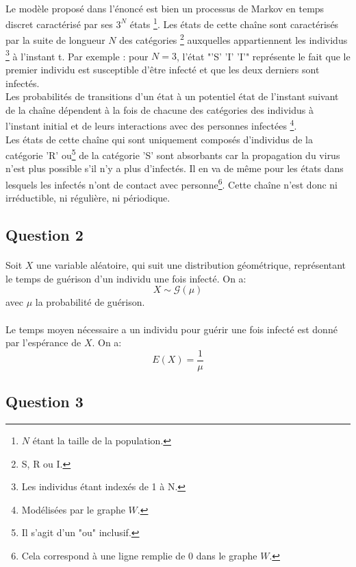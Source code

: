 \documentclass[a4paper, 12pt, oneside]{article}
\begin{document}
\paragraph{}Le modèle proposé dans l'énoncé est bien un processus de Markov en temps discret caractérisé par ses $3^N$ états \footnote{$N$ étant la taille de la population.}. Les états de cette chaîne sont caractérisés par la suite de longueur $N$ des catégories \footnote{S, R ou I.} auxquelles appartiennent les individus \footnote{Les individus étant indexés de 1 à N.} à l'instant t. Par exemple : pour $N = 3$, l'état "'S' 'I' 'I'" représente le fait que le premier individu est susceptible d'être infecté et que les deux derniers sont infectés.\\
\indent Les probabilités de transitions d'un état à un potentiel état de l'instant suivant de la chaîne dépendent à la fois de chacune des catégories des individus à l'instant initial et de leurs interactions avec des personnes infectées \footnote{Modélisées par le graphe $W$.}.\\
\indent Les états de cette chaîne qui sont uniquement composés d'individus de la catégorie 'R' ou\footnote{Il s'agit d'un "ou" inclusif.} de la catégorie 'S' sont absorbants car la propagation du virus n'est plus possible s'il n'y a plus d'infectés. Il en va de même pour les états dans lesquels les infectés n'ont de contact avec personne\footnote{Cela correspond à une ligne remplie de 0 dans le graphe $W$.}. Cette chaîne n'est donc ni irréductible, ni régulière, ni périodique.

\subsection{Question 2}

\paragraph{}Soit $X$ une variable aléatoire, qui suit une distribution géométrique, représentant le temps de guérison d'un individu une fois infecté. On a: $$X \sim \mathcal{G}(\mu)$$ avec $\mu$ la probabilité de guérison.
\paragraph{}Le temps moyen nécessaire a un individu pour guérir une fois infecté est donné par l'espérance de $X$. On a: $$E(X) = \frac{1}{\mu}$$

\subsection{Question 3}
\end{document}
